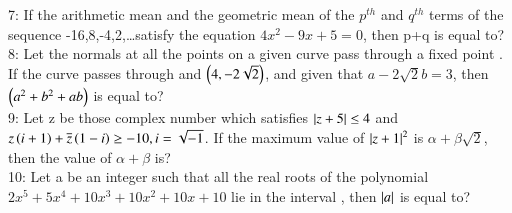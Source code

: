 \documentclass[journal,12pt,twocolumn]{IEEEtran}
\theoremstyle{remark}
\begin{document}
7: If the arithmetic mean and the geometric mean of the $p^{th}$ and $q^{th}$ terms of the sequence -16,8,-4,2,\ldots satisfy the equation $4x^2-9x+5=0$, then p+q is equal to?\vspace{0.5mm}\\
8: Let the normals at all the points on a given curve pass through a fixed point . If the curve passes through  and $\left(4,-2\sqrt{2}\right)$, and given that $a-2\sqrt{2}b = 3$, then $\left(a^2+b^2+ab\right)$ is equal to?\vspace{0.5mm}\\
9: Let z be those complex number which satisfies $\left\vert z+5\right\vert\leq 4$ and $z\left(i+1\right)+\overline{z}\left(1-i\right)\geq-10, i = \sqrt{-1}$. If the maximum value of $\left\vert z+1\right\vert^2$ is $\alpha + \beta \sqrt{2}$, then the value of $\alpha+\beta$ is?\vspace{0.5mm}\\
10: Let a be an integer such that all the real roots of the polynomial $2x^5+5x^4+10x^3+10x^2+10x+10$ lie in the interval , then $\left\vert a\right\vert$ is equal to?
\end{document}
